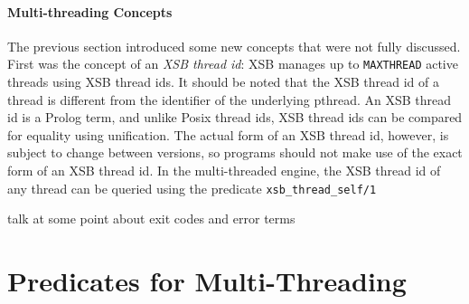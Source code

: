 \paragraph{Multi-threading Concepts}

The previous section introduced some new concepts that were not fully
discussed.  First was the concept of an {\em XSB thread id}: XSB
manages up to {\tt MAXTHREAD} active threads using XSB thread ids.  It
should be noted that the XSB thread id of a thread is different from
the identifier of the underlying pthread.  An XSB thread id is a
Prolog term, and unlike Posix thread ids, XSB thread ids can be
compared for equality using unification.  The actual form of an XSB
thread id, however, is subject to change between versions, so programs
should not make use of the exact form of an XSB thread id.  In the
multi-threaded engine, the XSB thread id of any thread can be queried
using the predicate {\tt xsb\_thread\_self/1}

{\sc talk at some point about exit codes and error terms}

\section{Predicates for Multi-Threading}

